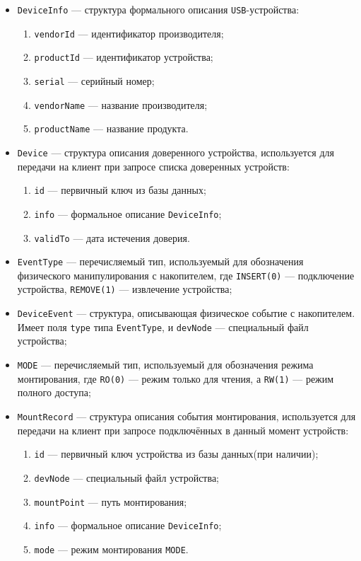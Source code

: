 \begin{itemize}[label=---]
    \item \texttt{DeviceInfo} --- структура формального описания \texttt{USB}-устройства:
        \begin{enumerate}
        \item \texttt{vendorId} --- идентификатор производителя;
        \item \texttt{productId} --- идентификатор устройства;
        \item \texttt{serial} --- серийный номер;
        \item \texttt{vendorName} --- название производителя;
        \item \texttt{productName} --- название продукта.
        \end{enumerate}
    \item \texttt{Device} --- структура описания доверенного устройства, используется для передачи на клиент при запросе списка
    доверенных устройств:
        \begin{enumerate}
        \item \texttt{id} --- первичный ключ из базы данных;
        \item \texttt{info} --- формальное описание \texttt{DeviceInfo};
        \item \texttt{validTo} --- дата истечения доверия.
        \end{enumerate}
    \item \texttt{EventType} --- перечисляемый тип, используемый для обозначения физического манипулирования
    с накопителем, где \texttt{INSERT(0)} --- подключение устройства, \texttt{REMOVE(1)} --- извлечение устройства;
    \item \texttt{DeviceEvent} --- структура, описывающая физическое событие с накопителем. Имеет поля \texttt{type} 
    типа \texttt{EventType}, и \texttt{devNode} --- специальный файл устройства;
    \item \texttt{MODE} --- перечисляемый тип, используемый для обозначения режима монтирования, где 
    \texttt{RO(0)} --- режим только для чтения, а \texttt{RW(1)} --- режим полного доступа;
    \item \texttt{MountRecord} --- структура описания события монтирования, используется для передачи на клиент при запросе подключённых
    в данный момент устройств:
        \begin{enumerate}
        \item \texttt{id} --- первичный ключ устройства из базы данных(при наличии);
        \item \texttt{devNode} --- специальный файл устройства;
        \item \texttt{mountPoint} --- путь монтирования;
        \item \texttt{info} --- формальное описание \texttt{DeviceInfo};
        \item \texttt{mode} --- режим монтирования \texttt{MODE}.
        \end{enumerate}
\end{itemize}

